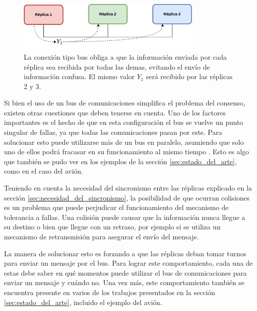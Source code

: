 \begin{figure}[H]
    \centering
    \includegraphics[width=0.8\textwidth]{img/TMR_bus.png}
    \caption{La conexión tipo bus obliga a que la información enviada por cada réplica sea recibida por todas las demas, evitando el envío de información confusa. El mismo valor $Y_1$ será recibido por las réplicas 2 y 3.}
    \label{fig:TMR_bus}    
\end{figure}


Si bien el uso de un bus de comunicaciones simplifica el problema del consenso, existen otras cuestiones que deben tenerse en cuenta. Uno de los factores importantes es el hecho de que en esta configuración el bus se vuelve un punto singular de fallas, ya que todas las comunicaciones pasan por este. Para solucionar esto puede utilizarse más de un bus en paralelo, asumiendo que solo uno de ellos podrá fracasar en su funcionamiento al mismo tiempo \cite[p.~157]{kopetz-2011}. Esto es algo que también se pudo ver en los ejemplos de la sección \ref{sec:estado_del_arte}, como en el caso del avión.

Teniendo en cuenta la necesidad del sincronismo entre las réplicas explicado en la sección \ref{sec:necesidad_del_sincronismo}, la posibilidad de que ocurran colisiones es un problema que puede perjudicar el funcionamiento del mecanismo de tolerancia a fallas. Una colisión puede causar que la información nunca llegue a su destino o bien que llegue con un retraso, por ejemplo si se utiliza un mecanismo de retransmisión para asegurar el envío del mensaje.

La manera de solucionar esto es forzando a que las réplicas deban tomar turnos para enviar un mensaje por el bus. Para lograr este comportamiento, cada una de estas debe saber en qué momentos puede utilizar el bus de comunicaciones para enviar un mensaje y cuándo no. Una vez más, este comportamiento también se encuentra presente en varios de los trabajos presentados en la sección \ref{sec:estado_del_arte}, incluido el ejemplo del avión.

